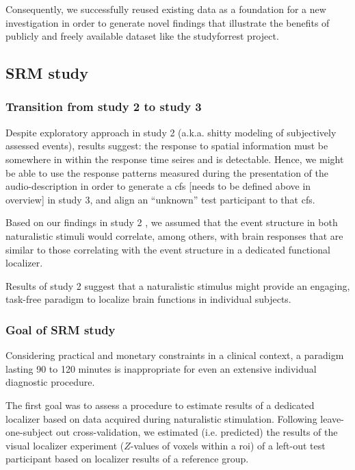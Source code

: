 
%
Consequently, we successfully reused existing data as a foundation for a new
investigation in order to generate novel findings that illustrate the benefits
of publicly and freely available dataset like the studyforrest project.


\subsection{SRM study}



\subsubsection{Transition from study 2 to study 3}
%
Despite exploratory approach in study 2 (a.k.a. shitty modeling of subjectively
assessed events), results suggest:
%
the response to spatial information must be somewhere in within the response
time seires and is detectable.
%
Hence, we might be able to use the response patterns measured during the
presentation of the audio-description in order to generate a \ac{cfs} [needs to
be defined above in overview] in study 3, and align an ``unknown'' test
participant to that \ac{cfs}.

Based on our findings in study 2 \citep{haeusler2022processing}, we assumed that
the event structure in both naturalistic stimuli would correlate, among others,
with brain responses that are similar to those correlating with the event
structure in a dedicated functional localizer.

Results of study 2 suggest that a naturalistic stimulus might provide an
engaging, task-free paradigm to localize brain functions in individual subjects.



\subsubsection{Goal of SRM study}

Considering practical and monetary constraints in a clinical context, a paradigm
lasting 90 to 120 minutes is inappropriate for even an extensive individual
diagnostic procedure.

The first goal was to assess a procedure to estimate results of a dedicated
localizer \citep{sengupta2016extension} based on data acquired during
naturalistic stimulation.
%
Following leave-one-subject out cross-validation, we estimated (i.e. predicted)
the results of the visual localizer experiment ($Z$-values of voxels within a
\ac{roi}) of a left-out test participant based on localizer results of a
reference group.

